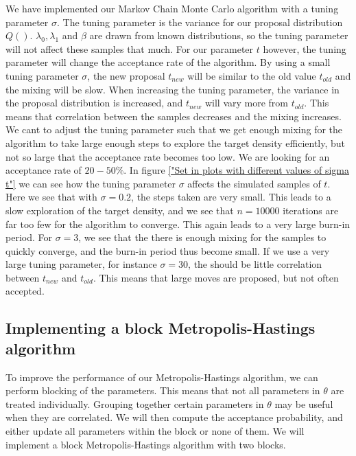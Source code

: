 We have implemented our Markov Chain Monte Carlo algorithm with a tuning parameter $\sigma$. The tuning parameter is the variance for our proposal distribution $Q()$. $\lambda_0, \lambda_1$ and $\beta$ are drawn from known distributions, so the tuning parameter will not affect these samples that much. For our parameter $t$ however, the tuning parameter will change the acceptance rate of the algorithm. By using a small tuning parameter $\sigma$, the new proposal $t_{new}$ will be similar to the old value $t_{old}$ and the mixing will be slow. When increasing the tuning parameter, the variance in the proposal distribution is increased, and $t_{new}$ will vary more from $t_{old}$. This means that correlation between the samples decreases and the mixing increases. We cant to adjust the tuning parameter such that we get enough mixing for the algorithm to take large enough steps to explore the target density efficiently, but not so large that the acceptance rate becomes too low. We are looking for an acceptance rate of $20 - 50\%$. In figure \ref{"Set in plots with different values of sigma t"} we can see how the tuning parameter $\sigma$ affects the simulated samples of $t$.  Here we see that with $\sigma = 0.2$, the steps taken are very small. This leads to a slow exploration of the target density, and we see that $n = 10000$ iterations are far too few for the algorithm to converge. This again leads to a very large burn-in period. For $\sigma = 3$, we see that the there is enough mixing for the samples to quickly converge, and the burn-in period thus become small. If we use a very large tuning parameter, for instance $\sigma = 30$, the should be little correlation between $t_{new}$ and $t_{old}$. This means that large moves are proposed, but not often accepted. 




\subsection{Implementing a block Metropolis-Hastings algorithm}

To improve the performance of our Metropolis-Hastings algorithm, we can perform blocking of the parameters. This means that not all parameters in $\theta$ are treated individually. Grouping together certain parameters in $\theta$ may be useful when they are correlated. We will then compute the acceptance probability, and either update all parameters within the block or none of them. We will implement a block Metropolis-Hastings algorithm with two blocks.

